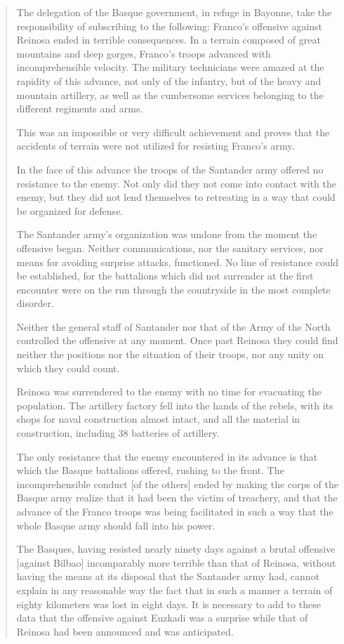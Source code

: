 \begin{quotation}
  The delegation of the Basque government, in refuge in Bayonne, take the responsibility of subscribing to the following: Franco’s offensive against Reinosa ended in terrible consequences. In a terrain composed of great mountains and deep gorges, Franco’s troops advanced with incomprehensible velocity. The military technicians were amazed at the rapidity of this advance, not only of the infantry, but of the heavy and mountain artillery\kn, as well as the cumbersome services belonging to the different regiments and arms.
  
  This was an impossible or very difficult achievement and proves that the accidents of terrain were not utilized for resisting Franco’s army.
  
  In the face of this advance the troops of the Santander army offered no resistance to the enemy. Not only did they not come into contact with the enemy, but they did not lend themselves to retreating in a way that could be organized for defense.
  
  The Santander army’s organization was undone from the moment the offensive began. Neither communications, nor the sanitary services, nor means for avoiding surprise attacks, functioned. No line of resistance could be established, for the battalions which did not surrender at the first encounter were on the run through the countryside in the most complete disorder.
  
  Neither the general staff of Santander nor that of the Army of the North controlled the offensive at any moment. Once past Reinosa they could find neither the positions nor the situation of their troops, nor any unity on which they could count.
  
  Reinosa was surrendered to the enemy with no time for evacuating the population. The artillery factory fell into the hands of the rebels, with its shops for naval construction almost intact, and all the material in construction, including 38 batteries of artillery.
  \nowidow
  
  The only resistance that the enemy encountered in its advance is that which the Basque battalions offered, rushing to the front. The incomprehensible conduct [of the others] ended by making the corps of the Basque army realize that it had been the victim of treachery, and that the advance of the Franco troops was being facilitated in such a way that the whole Basque army should fall into his power.
  
  The Basques, having resisted nearly ninety days against a brutal offensive [against Bilbao] incomparably more terrible than that of Reinosa, without having the means at its disposal that the Santander army had, cannot explain in any reasonable way the fact that in such a manner a terrain of eighty kilometers was lost in eight days. It is necessary to add to these data that the offensive against Euzkadi was a surprise while that of Reinosa had been announced and was anticipated.
  

\end{quotation}
